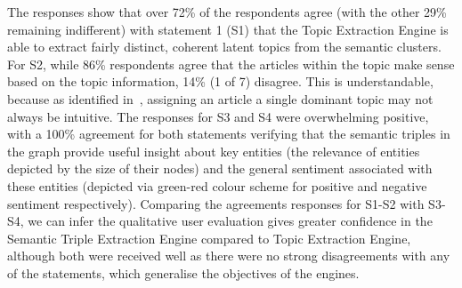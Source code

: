 The responses show that over 72\% of the respondents agree (with the other 29\% remaining indifferent) with statement 1 (S1) that the Topic Extraction Engine is able to extract fairly distinct, coherent latent topics from the semantic clusters. For S2, while 86\% respondents agree that the articles within the topic make sense based on the topic information, 14\% (1 of 7) disagree. This is understandable, because as identified in~, assigning an article a single dominant topic may not always be intuitive. The responses for S3 and S4 were overwhelming positive, with a 100\% agreement for both statements verifying that the semantic triples in the graph provide useful insight about key entities (the relevance of entities depicted by the size of their nodes) and the general sentiment associated with these entities (depicted via green-red colour scheme for positive and negative sentiment respectively). Comparing the agreements responses for S1-S2 with S3-S4, we can infer the qualitative user evaluation gives greater confidence in the Semantic Triple Extraction Engine compared to Topic Extraction Engine, although both were received well as there were no strong disagreements with any of the statements, which generalise the objectives of the engines. 
